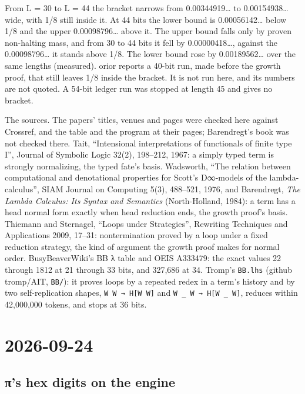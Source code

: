 From L = 30 to L = 44 the bracket narrows from 0.00344919… to 0.00154938… wide, with 1/8 still inside it. At 44 bits the lower bound is 0.00056142… below 1/8 and the upper 0.00098796… above it. The upper bound falls only by proven non-halting mass, and from 30 to 44 bits it fell by 0.00000418…, against the 0.00098796… it stands above 1/8. The lower bound rose by 0.00189562… over the same lengths (measured). orior reports a 40-bit run, made before the growth proof, that still leaves 1/8 inside the bracket. It is not run here, and its numbers are not quoted. A 54-bit ledger run was stopped at length 45 and gives no bracket.

The sources. The papers' titles, venues and pages were checked here against Crossref, and the table and the program at their pages; Barendregt's book was not checked there. Tait, “Intensional interpretations of functionals of finite type I”, Journal of Symbolic Logic 32(2), 198–212, 1967: a simply typed term is strongly normalizing, the typed fate's basis. Wadsworth, “The relation between computational and denotational properties for Scott's D∞-models of the lambda-calculus”, SIAM Journal on Computing 5(3), 488–521, 1976, and Barendregt, \emph{The Lambda Calculus: Its Syntax and Semantics} (North-Holland, 1984): a term has a head normal form exactly when head reduction ends, the growth proof's basis. Thiemann and Sternagel, “Loops under Strategies”, Rewriting Techniques and Applications 2009, 17–31: nontermination proved by a loop under a fixed reduction strategy, the kind of argument the growth proof makes for normal order. BusyBeaverWiki's BB λ table and OEIS A333479: the exact values 22 through 1812 at 21 through 33 bits, and 327,686 at 34. Tromp's \texttt{BB.\allowbreak{}lhs} (github tromp/AIT, \texttt{BB/\allowbreak{}}): it proves loops by a repeated redex in a term's history and by two self-replication shapes, \texttt{W W → H[W W]} and \texttt{W \_\allowbreak{} W → H[W \_\allowbreak{} W]}, reduces within 42,000,000 tokens, and stops at 36 bits.

\section{\texorpdfstring{2026-09-24}{2026-09-24}}

\subsection{\texorpdfstring{π's hex digits on the engine}{π's hex digits on the engine}}

